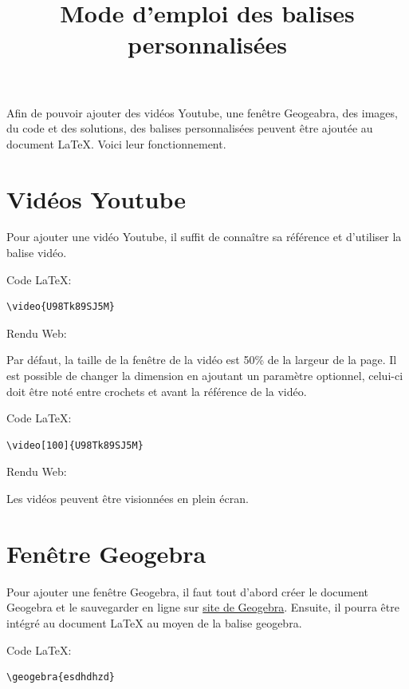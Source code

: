 \documentclass[a4paper,11pt]{article}
\begin{document}
\title{Mode d'emploi des balises personnalisées}
\date{}
\maketitle

Afin de pouvoir ajouter des vidéos Youtube, une fenêtre Geogeabra, des images, du code et des
solutions, des balises personnalisées peuvent être ajoutée au document LaTeX. Voici leur fonctionnement.

\section{Vidéos Youtube}
Pour ajouter une vidéo Youtube, il suffit de connaître sa référence et d’utiliser la balise vidéo.\par

Code LaTeX:
\begin{lstlisting}
\video{U98Tk89SJ5M}
\end{lstlisting}

Rendu Web:\par
{}

Par défaut, la taille de la fenêtre de la vidéo est 50\% de la largeur de la page. Il est possible de
changer la dimension en ajoutant un paramètre optionnel, celui-ci doit être noté entre crochets
et avant la référence de la vidéo.\par

Code LaTeX:
\begin{lstlisting}
\video[100]{U98Tk89SJ5M}
\end{lstlisting}

Rendu Web:\par
{}

Les vidéos peuvent être visionnées en plein écran.

\section{Fenêtre Geogebra}
Pour ajouter une fenêtre Geogebra, il faut tout d’abord créer le document Geogebra et le sauvegarder en ligne sur \href{https://www.geogebra.org/}{site de Geogebra}. Ensuite, il pourra être intégré au document LaTeX au moyen de la balise geogebra.\par

Code LaTeX:
\begin{lstlisting}
\geogebra{esdhdhzd}
\end{lstlisting}
\end{document}
